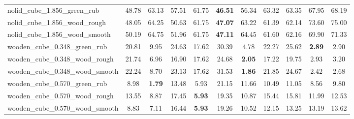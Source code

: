 \begin{table}[H]
{\begin{tabular}{l cccccccccc}
        nolid\_cube\_1.856\_green\_rub & 48.78 & 63.13 & 57.51 & 61.75 & \textbf{46.51} & 56.34 & 63.32 & 63.35 & 67.95 & 68.19 \\
        nolid\_cube\_1.856\_wood\_rough & 48.05 & 64.25 & 50.63 & 61.75 & \textbf{47.07} & 63.22 & 61.39 & 62.14 & 73.60 & 75.00 \\
        nolid\_cube\_1.856\_wood\_smooth & 50.19 & 64.75 & 51.96 & 61.75 & \textbf{47.11} & 64.45 & 61.60 & 62.16 & 69.90 & 71.33 \\
        wooden\_cube\_0.348\_green\_rub & 20.81 & 9.95 & 24.63 & 17.62 & 30.39 & 4.78 & 22.27 & 25.62 & \textbf{2.89} & 2.90 \\
        wooden\_cube\_0.348\_wood\_rough & 21.74 & 6.96 & 16.90 & 17.62 & 24.68 & \textbf{2.05} & 17.22 & 19.75 & 2.93 & 3.20 \\
        wooden\_cube\_0.348\_wood\_smooth & 22.24 & 8.70 & 23.13 & 17.62 & 31.53 & \textbf{1.86} & 21.85 & 24.67 & 2.42 & 2.68 \\
        wooden\_cube\_0.570\_green\_rub & 8.98 & \textbf{1.79} & 13.48 & 5.93 & 21.15 & 11.66 & 10.49 & 11.05 & 8.56 & 9.80 \\
        wooden\_cube\_0.570\_wood\_rough & 13.55 & 8.87 & 17.45 & \textbf{5.93} & 19.35 & 10.87 & 15.44 & 15.81 & 11.99 & 12.53 \\
        wooden\_cube\_0.570\_wood\_smooth & 8.83 & 7.11 & 16.44 & \textbf{5.93} & 19.26 & 10.52 & 12.15 & 13.25 & 13.19 & 13.62 \\
        \bottomrule
    \end{tabular}
    }
\end{table}



\vspace{1cm}

\clearpage

